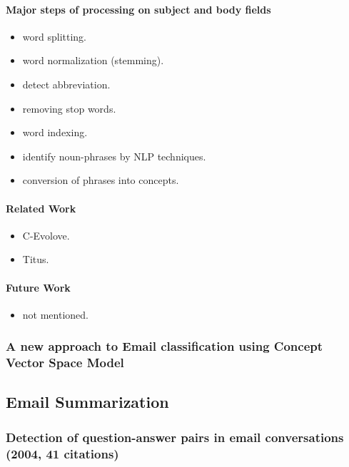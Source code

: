 \documentclass[12pt]{article}
\begin{document}
\paragraph{Major steps of processing on subject and body fields}
\begin{itemize}
    \item word splitting.
    \item word normalization (stemming).
    \item detect abbreviation.
    \item removing stop words.
    \item word indexing.
    \item identify noun-phrases by NLP techniques.
    \item conversion of phrases into concepts.
\end{itemize}

\paragraph{Related Work}
\begin{itemize}
    \item C-Evolove.
    \item Titus.
\end{itemize}


\paragraph{Future Work}
\begin{itemize}
    \item not mentioned.
\end{itemize}


\subsubsection{A new approach to Email classification using Concept Vector Space Model}




\subsection{Email Summarization}
\subsubsection{Detection of question-answer pairs in email conversations (2004, 41 citations)}
\end{document}
